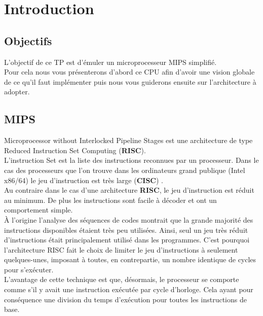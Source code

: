 \section{Introduction}

\subsection{Objectifs}

L'objectif de ce TP est d'émuler un microprocesseur MIPS simplifié.\\
Pour cela nous vous présenterons d'abord ce CPU afin d'avoir une vision globale de ce qu'il faut implémenter puis nous vous guiderons ensuite sur l'architecture à adopter.

\subsection{MIPS}

	Microprocessor without Interlocked Pipeline Stages est une architecture de type Reduced Instruction Set Computing (\textbf{RISC}).\\
	\indent L'instruction Set est la liste des instructions reconnues par un processeur. Dans le cas des processeurs que l'on trouve dans les ordinateurs grand publique (Intel x86/64) le jeu d'instruction est très large (\textbf{CISC}) .\\
    \indent Au contraire dans le cas d'une architecture \textbf{RISC}, le jeu d'instruction est réduit au minimum. De plus les instructions sont facile à décoder et ont un comportement simple.\\
    
    À l'origine l'analyse des séquences de codes montrait que la grande majorité des instructions disponibles étaient très peu utilisées. Ainsi, seul un jeu très réduit d'instructions était principalement utilisé dans les programmes. C'est pourquoi l'architecture RISC fait le choix de limiter le jeu d'instructions à seulement quelques-unes, imposant à toutes, en contrepartie, un nombre identique de cycles pour s'exécuter. \\
    
    L'avantage de cette technique est que, désormais, le processeur se comporte comme s'il y avait une instruction exécutée par cycle d'horloge. Cela ayant pour conséquence une division du temps d'exécution pour toutes les instructions de base.


\newpage
